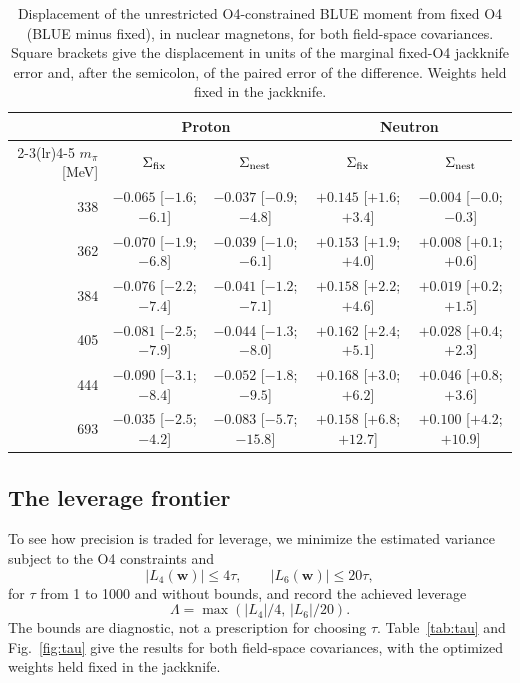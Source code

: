 \documentclass[aps,prd,reprint,twocolumn,superscriptaddress,nofootinbib,longbibliography]{revtex4-2}
\begin{document}
\begin{table}[t]
\caption{Displacement of the unrestricted O4-constrained BLUE moment from fixed O4 (BLUE minus fixed), in nuclear magnetons, for both field-space covariances. Square brackets give the displacement in units of the marginal fixed-O4 jackknife error and, after the semicolon, of the paired error of the difference. Weights held fixed in the jackknife.}
\label{tab:displacement}
\centering
\begin{tabular}{rcccc}
\toprule
& \multicolumn{2}{c}{Proton} & \multicolumn{2}{c}{Neutron}\\
\cmidrule(lr){2-3}\cmidrule(lr){4-5}
$m_\pi$ [MeV] & $\Sigma_{\rm fix}$ & $\Sigma_{\rm nest}$ & $\Sigma_{\rm fix}$ & $\Sigma_{\rm nest}$\\
\midrule
338 & $-0.065$ [$-1.6$; $-6.1$] & $-0.037$ [$-0.9$; $-4.8$] & $+0.145$ [$+1.6$; $+3.4$] & $-0.004$ [$-0.0$; $-0.3$] \\
362 & $-0.070$ [$-1.9$; $-6.8$] & $-0.039$ [$-1.0$; $-6.1$] & $+0.153$ [$+1.9$; $+4.0$] & $+0.008$ [$+0.1$; $+0.6$] \\
384 & $-0.076$ [$-2.2$; $-7.4$] & $-0.041$ [$-1.2$; $-7.1$] & $+0.158$ [$+2.2$; $+4.6$] & $+0.019$ [$+0.2$; $+1.5$] \\
405 & $-0.081$ [$-2.5$; $-7.9$] & $-0.044$ [$-1.3$; $-8.0$] & $+0.162$ [$+2.4$; $+5.1$] & $+0.028$ [$+0.4$; $+2.3$] \\
444 & $-0.090$ [$-3.1$; $-8.4$] & $-0.052$ [$-1.8$; $-9.5$] & $+0.168$ [$+3.0$; $+6.2$] & $+0.046$ [$+0.8$; $+3.6$] \\
693 & $-0.035$ [$-2.5$; $-4.2$] & $-0.083$ [$-5.7$; $-15.8$] & $+0.158$ [$+6.8$; $+12.7$] & $+0.100$ [$+4.2$; $+10.9$] \\
\bottomrule
\end{tabular}
\end{table}

\subsection{The leverage frontier}
\label{sec:tau}

To see how precision is traded for leverage, we minimize the estimated variance subject to the O4 constraints and
\begin{equation}
|L_4(\bm w)|\le4\tau,\qquad |L_6(\bm w)|\le20\tau,
\label{eq:tau}
\end{equation}
for $\tau$ from 1 to 1000 and without bounds, and record the achieved leverage
\begin{equation}
\Lambda=\max(|L_4|/4,\,|L_6|/20).
\end{equation}
 The bounds are diagnostic, not a prescription for choosing $\tau$. Table~\ref{tab:tau} and Fig.~\ref{fig:tau} give the results for both field-space covariances, with the optimized weights held fixed in the jackknife.
\end{document}
